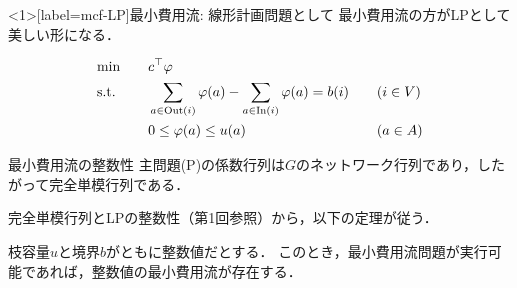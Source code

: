 \documentclass[14pt,aspectratio=169,xcolor=dvipsnames,table,onlytextwidth,dvipdfmx]{beamer}
\begin{document}
\begin{frame}<1>[label=mcf-LP]{最小費用流: 線形計画問題として}
    最小費用流の方がLPとして美しい形になる．

    \footnotesize
    \begin{primal}
        \setlength{\abovedisplayskip}{0pt}
        \begin{alignat*}{3}
            &\text{min}   &\quad& c^\top\varphi &\quad& \\
            &\text{s.t.}  &\quad& \sum_{a \in \operatorname{Out}(i)} \varphi(a)  - \sum_{a \in \operatorname{In}(i)} \varphi(a) = b(i) &\quad& (i \in V) \\
            &             &\quad& 0 \leq \varphi(a) \leq u(a) &\quad& (a \in A) 
        \end{alignat*}
    \end{primal}
    \begin{dual}
        \setlength{\abovedisplayskip}{0pt}
    \end{dual}
\end{frame}

\begin{frame}{最小費用流の整数性}
    主問題(P)の係数行列は$G$のネットワーク行列であり，したがって完全単模行列である．

    完全単模行列とLPの整数性（第1回参照）から，以下の定理が従う．

    \bigskip
    \begin{theorem}
        枝容量$u$と境界$b$がともに整数値だとする．
        このとき，最小費用流問題が実行可能であれば，整数値の最小費用流が存在する．
    \end{theorem}
\end{frame}
\end{document}
